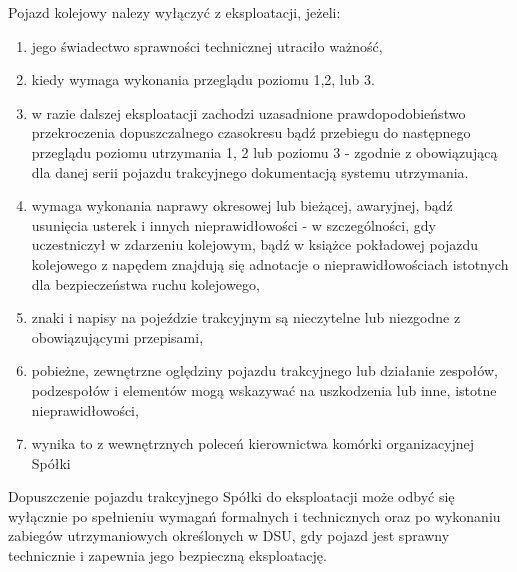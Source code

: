 Pojazd kolejowy nalezy wyłączyć z eksploatacji, jeżeli:
\begin{enumerate}
	\item jego świadectwo sprawności technicznej utraciło ważność,
	\item kiedy wymaga wykonania przeglądu poziomu 1,2, lub 3.
	\item w razie dalszej eksploatacji zachodzi uzasadnione prawdopodobieństwo
	przekroczenia dopuszczalnego czasokresu bądź przebiegu do następnego
	przeglądu poziomu utrzymania 1, 2 lub poziomu 3 - zgodnie z obowiązującą
	dla danej serii pojazdu trakcyjnego dokumentacją systemu utrzymania.
	\item wymaga wykonania naprawy okresowej lub bieżącej, awaryjnej, bądź usunięcia
	usterek i innych nieprawidłowości - w szczególności, gdy uczestniczył w zdarzeniu kolejowym, bądź w książce pokładowej pojazdu kolejowego z napędem znajdują się adnotacje o nieprawidłowościach istotnych dla bezpieczeństwa ruchu kolejowego,
	\item znaki i napisy na pojeździe trakcyjnym są nieczytelne lub niezgodne z obowiązującymi przepisami,
	\item pobieżne, zewnętrzne oględziny pojazdu trakcyjnego lub działanie zespołów, podzespołów i elementów mogą wskazywać na uszkodzenia lub inne, istotne nieprawidłowości,
	\item wynika to z wewnętrznych poleceń kierownictwa komórki organizacyjnej Spółki
\end{enumerate}

Dopuszczenie pojazdu trakcyjnego Spółki do eksploatacji może odbyć się wyłącznie po spełnieniu wymagań formalnych i technicznych oraz po wykonaniu zabiegów utrzymaniowych określonych w DSU, gdy pojazd jest sprawny technicznie i zapewnia jego bezpieczną eksploatację.

